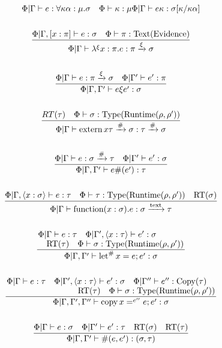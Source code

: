\documentclass {article}
\begin{document}
\begin{gather*}
{\Phi | \Gamma \vdash e : \forall \kappa \alpha : \mu. \sigma \quad \Phi \vdash \kappa : \mu}
{\Phi | \Gamma \vdash e \kappa : \sigma [\kappa/\kappa \alpha]} \\
\\
\frac
{\Phi | \Gamma, [x : \pi] \vdash e : \sigma \quad \Phi \vdash \pi : \text{Text}(\text{Evidence})}
{\Phi | \Gamma \vdash \lambda^\xi x : \pi. e : \pi \xrightarrow{\xi} \sigma} \\
\\
\frac
{\Phi | \Gamma \vdash e : \pi \xrightarrow{\xi} \sigma \quad \Phi | \Gamma' \vdash e' : \pi }
{\Phi | \Gamma, \Gamma' \vdash e \xi e' : \sigma} \\
\\
\frac
{RT(\tau) \quad \Phi \vdash \sigma : \text{Type}(\text{Runtime} (\rho, \rho'))}
{\Phi | \Gamma \vdash \text{extern} \, x \tau \xrightarrow{\#} \sigma : \tau \xrightarrow{\#} \sigma} \\
\\
\frac
{\Phi | \Gamma \vdash e : \sigma \xrightarrow{\#} \tau \quad \Phi | \Gamma' \vdash e' : \sigma}
{\Phi | \Gamma, \Gamma' \vdash e\#(e') : \tau} \\
\\
\frac
{\Phi | \Gamma, \langle x : \sigma \rangle \vdash e : \tau \quad \Phi \vdash \tau : \text{Type}(\text{Runtime}(\rho, \rho')) \quad \text{RT}(\sigma)}
{\Phi | \Gamma \vdash \text{function}(x : \sigma). e : \sigma \xrightarrow{\text{text}} \tau} \\
\\
\frac
{\splitfrac{ \Phi | \Gamma \vdash e : \tau \quad \Phi | \Gamma', \langle x : \tau \rangle \vdash e' : \sigma}
{\text{RT}(\tau) \quad \Phi \vdash \sigma : \text{Type}(\text{Runtime}(\rho, \rho')) }}
{\Phi | \Gamma, \Gamma' \vdash \text{let}^\# \, x = e; e' : \sigma} \\
\\
\frac
{\splitfrac{ \Phi | \Gamma \vdash e : \tau \quad \Phi | \Gamma', \langle x : \tau \rangle \vdash e' : \sigma \quad \Phi | \Gamma'' \vdash e'' : \text{Copy}(\tau)}
{\text{RT}(\tau) \quad \Phi \vdash \sigma : \text{Type}(\text{Runtime}(\rho, \rho')) }}
{\Phi | \Gamma, \Gamma', \Gamma'' \vdash \text{copy} \, x =^{e''} e; e' : \sigma} \\
\\
\frac
{\Phi | \Gamma \vdash e : \sigma \quad \Phi | \Gamma' \vdash e' : \tau \quad \text{RT}(\sigma) \quad \text{RT}(\tau) }
{\Phi | \Gamma, \Gamma' \vdash \#(e, e') : (\sigma, \tau) } \\

\end{gather*}
\end{document}
